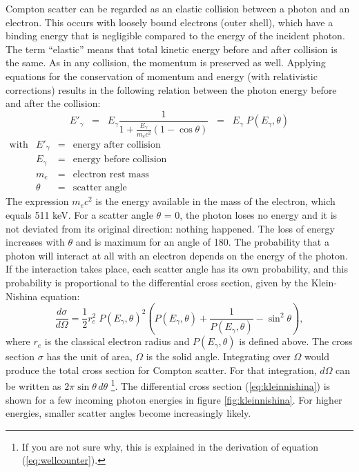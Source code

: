 \documentclass[11pt,oneside]{article}
\begin{document}
Compton scatter can be regarded as an elastic collision between a
photon and an electron. This occurs with loosely bound electrons
(outer shell), which have a binding energy that is negligible compared
to the energy of the incident photon. The term ``elastic'' means that
total kinetic energy before and after collision is the same. As in any
collision, the momentum is preserved as well. Applying equations for
the conservation of momentum and energy (with relativistic
corrections) results in the following relation between the photon
energy before and after the collision:
\begin{equation}
  E'_\gamma \;\;=\;\; E_\gamma \frac{1}{1 
     + \displaystyle\frac{E_\gamma}{m_e c^2} (1 - \cos\theta)} \label{eq:jn_compton_energy}
   \;\; = \;\; E_\gamma \; P(E_\gamma, \theta)
\end{equation}
%
$\begin{array}{llrl}
\mbox{with}
            & E'_\gamma & = & \mbox{energy after collision}\\
            & E_\gamma  & = & \mbox{energy before collision}\\
            & m_e       & = & \mbox{electron rest mass}\\
            & \theta    & = & \mbox{scatter angle}
\end{array}$\\
%
The expression $m_e c^2$ is the energy available in the mass of the
electron, which equals 511 keV. For a scatter angle $\theta$ = 0, the
photon loses no energy and it is not deviated from its original
direction: nothing happened.  The loss of energy increases with
$\theta$ and is maximum for an angle of 180\textdegree. The probability
that a photon will interact at all with an electron depends on the
energy of the photon. If the interaction takes place, each scatter
angle has its own probability, and this probability is proportional to
the differential cross section, given by the Klein-Nishina equation:
\begin{equation}
 \frac{d\sigma}{d\Omega} = \frac{1}{2} r_e^2 \; P(E_\gamma, \theta)^2
    \left( P(E_\gamma, \theta) + \frac{1}{P(E_\gamma, \theta)} - \sin^2\theta \right),
    \label{eq:kleinnishina}
\end{equation}
where $r_e$ is the classical electron radius and $P(E_\gamma, \theta)$
is defined above. The cross section $\sigma$ has the unit of area,
$\Omega$ is the solid angle. Integrating over $\Omega$
would produce the total cross section for Compton scatter. For that
integration, $d\Omega$ can be written as $2 \pi \sin\theta \,d\theta$
\footnote{If you are not sure why, this is explained in the derivation
  of equation (\ref{eq:wellcounter}).}.
The differential cross section (\ref{eq:kleinnishina}) is shown for a
few incoming photon energies in figure \ref{fig:kleinnishina}. For
higher energies, smaller scatter angles become increasingly likely.
\end{document}
